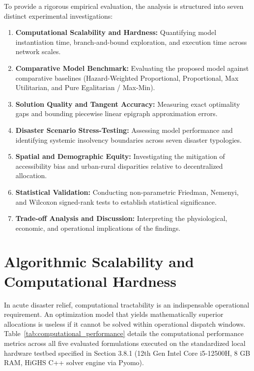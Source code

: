 To provide a rigorous empirical evaluation, the analysis is structured into seven distinct experimental investigations:
\begin{enumerate}
    \item \textbf{Computational Scalability and Hardness:} Quantifying model instantiation time, branch-and-bound exploration, and execution time across network scales.
    \item \textbf{Comparative Model Benchmark:} Evaluating the proposed model against comparative baselines (Hazard-Weighted Proportional, Proportional, Max Utilitarian, and Pure Egalitarian / Max-Min).
    \item \textbf{Solution Quality and Tangent Accuracy:} Measuring exact optimality gaps and bounding piecewise linear epigraph approximation errors.
    \item \textbf{Disaster Scenario Stress-Testing:} Assessing model performance and identifying systemic insolvency boundaries across seven disaster typologies.
    \item \textbf{Spatial and Demographic Equity:} Investigating the mitigation of accessibility bias and urban-rural disparities relative to decentralized allocation.
    \item \textbf{Statistical Validation:} Conducting non-parametric Friedman, Nemenyi, and Wilcoxon signed-rank tests to establish statistical significance.
    \item \textbf{Trade-off Analysis and Discussion:} Interpreting the physiological, economic, and operational implications of the findings.
\end{enumerate}


\section{Algorithmic Scalability and Computational Hardness}
\label{sec:computational_scalability}

In acute disaster relief, computational tractability is an indispensable operational requirement. An optimization model that yields mathematically superior allocations is useless if it cannot be solved within operational dispatch windows. Table~\ref{tab:computational_performance} details the computational performance metrics across all five evaluated formulations executed on the standardized local hardware testbed specified in Section 3.8.1 (12th Gen Intel Core i5-12500H, 8 GB RAM, HiGHS C++ solver engine via Pyomo).

